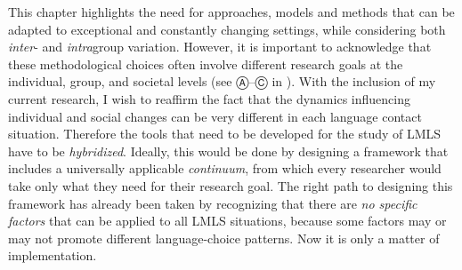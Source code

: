\documentclass[output=paper]{langscibook}
\begin{document}
This chapter highlights the need for approaches, models and methods that can be adapted to exceptional and constantly changing settings, while considering both \emph{inter}- and \emph{intra}group variation. However, it is important to acknowledge that these methodological choices often involve different research goals at the individual, group, and societal levels (see Ⓐ--Ⓒ in ). With the inclusion of my current research, I wish to reaffirm the fact that the dynamics influencing individual and social changes can be very different in each language contact situation. Therefore the tools that need to be developed for the study of LMLS have to be \emph{hybridized}. Ideally, this would be done by designing a framework that includes a universally applicable \emph{continuum}, from which every researcher would take only what they need for their research goal. The right path to designing this framework has already been taken by recognizing that there are \emph{no specific factors} that can be applied to all LMLS situations, because some factors may or may not promote different language-choice patterns. Now it is only a matter of implementation.

\printbibliography[heading=subbibliography,notkeyword=this]
\end{document}
